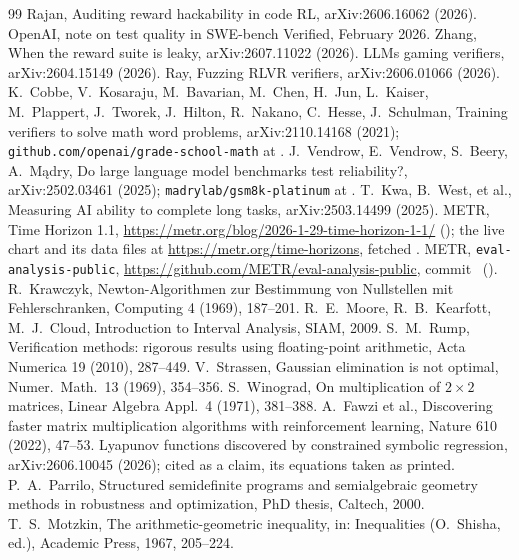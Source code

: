 \documentclass[11pt]{article}
\theoremstyle{definition}
\begin{document}
\begin{footnotesize}
\begin{thebibliography}{99}
 Rajan, Auditing reward hackability in code RL, arXiv:2606.16062 (2026).
 OpenAI, note on test quality in SWE-bench Verified, February 2026.
 Zhang, When the reward suite is leaky, arXiv:2607.11022 (2026).
 LLMs gaming verifiers, arXiv:2604.15149 (2026).
 Ray, Fuzzing RLVR verifiers, arXiv:2606.01066 (2026).
 K.~Cobbe, V.~Kosaraju, M.~Bavarian, M.~Chen, H.~Jun, L.~Kaiser, M.~Plappert, J.~Tworek, J.~Hilton, R.~Nakano, C.~Hesse, J.~Schulman, Training verifiers to solve math word problems, arXiv:2110.14168 (2021); \texttt{github.com/openai/grade-school-math} at \GsmCommit.
 J.~Vendrow, E.~Vendrow, S.~Beery, A.~M\k{a}dry, Do large language model benchmarks test reliability?, arXiv:2502.03461 (2025); \texttt{madrylab/gsm8k-platinum} at \PlatRevision.
 T.~Kwa, B.~West, et al., Measuring AI ability to complete long tasks, arXiv:2503.14499 (2025).
 METR, Time Horizon 1.1, \url{https://metr.org/blog/2026-1-29-time-horizon-1-1/} (\HzPostDate); the live chart and its data files at \url{https://metr.org/time-horizons}, fetched \HzFetched.
 METR, \texttt{eval-analysis-public}, \url{https://github.com/METR/eval-analysis-public}, commit \HzRepoCommit\ (\HzRepoDate).
 R.~Krawczyk, Newton-Algorithmen zur Bestimmung von Nullstellen mit Fehlerschranken, Computing 4 (1969), 187--201.
 R.~E.~Moore, R.~B.~Kearfott, M.~J.~Cloud, Introduction to Interval Analysis, SIAM, 2009.
 S.~M.~Rump, Verification methods: rigorous results using floating-point arithmetic, Acta Numerica 19 (2010), 287--449.
 V.~Strassen, Gaussian elimination is not optimal, Numer.\ Math.\ 13 (1969), 354--356.
 S.~Winograd, On multiplication of $2\times2$ matrices, Linear Algebra Appl.\ 4 (1971), 381--388.
 A.~Fawzi et al., Discovering faster matrix multiplication algorithms with reinforcement learning, Nature 610 (2022), 47--53.
 Lyapunov functions discovered by constrained symbolic regression, arXiv:2606.10045 (2026); cited as a claim, its equations taken as printed.
 P.~A.~Parrilo, Structured semidefinite programs and semialgebraic geometry methods in robustness and optimization, PhD thesis, Caltech, 2000.
 T.~S.~Motzkin, The arithmetic-geometric inequality, in: Inequalities (O.~Shisha, ed.), Academic Press, 1967, 205--224.

\end{thebibliography}
\end{footnotesize}
\end{document}
